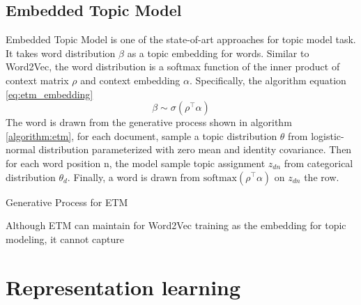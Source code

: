 \subsection{Embedded Topic Model} \label{ch2:etm}
Embedded Topic Model \cite{dieng_topic_2019} is one of the state-of-art approaches for topic model task. It takes word distribution $ \beta $ as a topic embedding for words. %
Similar to Word2Vec\cite{mikolov_distributed_nodate}, the word distribution is a softmax function of the inner product of context matrix $ \rho $ and context embedding $ \alpha $. Specifically, the algorithm   equation \ref{eq:etm_embedding}
\begin{equation}\label{eq:etm_embedding}
\beta\sim\sigma(\rho^\top\alpha)
\end{equation}
The word is drawn from the generative process shown in algorithm \ref{algorithm:etm}, for each document, sample a topic distribution $ \theta $ from logistic-normal distribution parameterized with zero mean and identity covariance. Then for each word position n, the model sample topic assignment $ z_{dn} $ from categorical distribution $ \theta_d $. Finally, a word is drawn from $ \text{softmax}(\rho^\top\alpha) $ on $ z_{dn} $ the row.\\
\begin{algorithm}[H]\label{algorithm:etm}
\caption{Generative Process for ETM}
\end{algorithm}
Although ETM can maintain for Word2Vec training as the embedding for topic modeling, it cannot capture 
\section{Representation learning}
